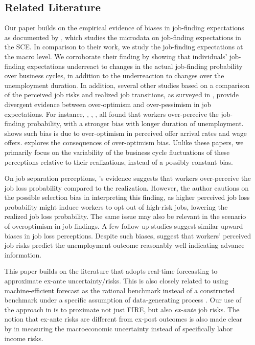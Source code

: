 \subsection*{Related Literature}

Our paper builds on the empirical evidence of biases in job-finding expectations as documented by \cite{mueller2021job}, which studies the microdata on job-finding expectations in the SCE. In comparison to their work, we study the job-finding expectations at the macro level. We corroborate their finding by showing that individuals' job-finding expectations underreact to changes in the actual job-finding probability over business cycles, in addition to the underreaction to changes over the unemployment duration. In addition, several other studies based on a comparison of the perceived job risks and realized job transitions, as surveyed in \cite{mueller2023expectations}, provide divergent evidence between over-optimism and over-pessimism in job expectations. For instance, \cite{arni2013s}, \cite{spinnewijn2015unemployed}, \cite{conlon2018labor}, \cite{mueller2021job} all found that workers over-perceive the job-finding probability, with a stronger bias with longer duration of unemployment. \cite{conlon2018labor} shows such bias is due to over-optimism in perceived offer arrival rates and wage offers. \cite{balleer2021effects} explores the consequences of over-optimism bias. Unlike these papers, we primarily focus on the variability of the business cycle fluctuations of these perceptions relative to their realizations, instead of a possibly constant bias. 

On job separation perceptions, \cite{stephens2004job}'s evidence suggests that workers over-perceive the job loss probability compared to the realization. However, the author cautions on the possible selection bias in interpreting this finding, as higher perceived job loss probability might induce workers to opt out of high-risk jobs, lowering the realized job loss probability. The same issue may also be relevant in the scenario of overoptimism in job findings. A few follow-up studies suggest similar upward biases in job loss perceptions.\citep{dickerson2012fears,balleer2023biased} Despite such biases, \cite{dickerson2012fears,hendren2017knowledge,pettinicchi2019job,hartmann2024subjective} suggest that workers' perceived job risks predict the unemployment outcome reasonably well indicating advance information. 

This paper builds on the literature that adopts real-time forecasting to approximate ex-ante uncertainty/risks. This is also closely related to using machine-efficient forecast as the rational benchmark instead of a constructed benchmark under a specific assumption of data-generating process \citep{bianchi2022belief}. Our use of the approach in \cite{bianchi2022belief} is to proximate not just FIRE, but also \emph{ex-ante} job risks. The notion that ex-ante risks are different from ex-post outcomes is also made clear by \cite{jurado2015measuring,rossi2015macroeconomic} in measuring the macroeconomic uncertainty instead of specifically labor income risks.


